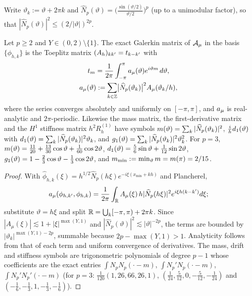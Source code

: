 Write $\vartheta_k:=\vartheta+2\pi k$ and
$\widehat N_p(\vartheta)=\bigl(\tfrac{\sin(\vartheta/2)}{\vartheta/2}\bigr)^p$
(up to a unimodular factor), so that $|\widehat N_p(\vartheta)|^2\le(2/|\vartheta|)^{2p}$.
\begin{lemma}\label{lem:periodisation}
Let $p\ge2$ and $Y\in(0,2)\setminus\{1\}$.  The exact Galerkin matrix of
$\mathcal A_\mu$ in the basis $\{\phi_{h,k}\}$ is the Toeplitz matrix
$(A_h)_{kk'}=t_{k-k'}$ with
\begin{equation}
\begin{gathered}
 t_m=\frac1{2\pi}\int_{-\pi}^{\pi}a_\mu(\vartheta)e^{i\vartheta m}\,d\vartheta,
 \\
 a_\mu(\vartheta):=\sum_{k\in\mathbb Z}\bigl|\widehat N_p(\vartheta_k)\bigr|^2A_\mu(\vartheta_k/h),
\end{gathered}
 \label{eq:periodised}
\end{equation}
where the series converges absolutely and uniformly on $[-\pi,\pi]$, and
$a_\mu$ is real-analytic and $2\pi$-periodic.  Likewise the mass matrix,
the first-derivative matrix and the $H^1$ stiffness matrix $h^2R^{(1)}_h$
have symbols
$m(\vartheta)=\sum_k|\widehat N_p(\vartheta_k)|^2$,
$\tfrac{i}{h}d_1(\vartheta)$ with $d_1(\vartheta)=\sum_k|\widehat N_p(\vartheta_k)|^2\vartheta_k$,
and $g_1(\vartheta)=\sum_k|\widehat N_p(\vartheta_k)|^2\vartheta_k^2$.
For $p=3$,
$m(\vartheta)=\tfrac{11}{20}+\tfrac{13}{30}\cos\vartheta+\tfrac1{60}\cos2\vartheta$,
$d_1(\vartheta)=\tfrac56\sin\vartheta+\tfrac1{12}\sin2\vartheta$,
$g_1(\vartheta)=1-\tfrac23\cos\vartheta-\tfrac13\cos2\vartheta$,
and $m_{\min}:=\min_\vartheta m=m(\pi)=2/15$.
\end{lemma}
\begin{proof}
With $\widehat\phi_{h,k}(\xi)=h^{1/2}\widehat N_p(h\xi)e^{-i\xi(x_{\min}+kh)}$ and
Plancherel,
\[
a_\mu(\phi_{h,k'},\phi_{h,k})=\frac1{2\pi}\int_{\mathbb{R}} A_\mu(\xi)\,h|\widehat N_p(h\xi)|^2e^{i\xi h(k-k')}d\xi;
\]
substitute $\vartheta=h\xi$ and split $\mathbb{R}=\bigcup_k[-\pi,\pi)+2\pi k$.  Since
$|A_\mu(\xi)|\lesssim 1+|\xi|^{\max(Y,1)}$ and $|\widehat N_p(\vartheta)|^2\lesssim|\vartheta|^{-2p}$,
the terms are bounded by $|\vartheta_k|^{\max(Y,1)-2p}$, summable because
$2p-\max(Y,1)>1$.  Analyticity follows from that of each term and uniform
convergence of derivatives.  The mass, drift and stiffness symbols are
trigonometric polynomials of degree $p-1$ whose coefficients are the exact
entries $\int N_pN_p(\cdot-m)$, $\int N_p'N_p(\cdot-m)$, $\int N_p'N_p'(\cdot-m)$
(for $p=3$: $\tfrac1{120}(1,26,66,26,1)$, $(\tfrac1{24},\tfrac5{12},0,-\tfrac5{12},-\tfrac1{24})$
and $(-\tfrac16,-\tfrac13,1,-\tfrac13,-\tfrac16)$).
\end{proof}

